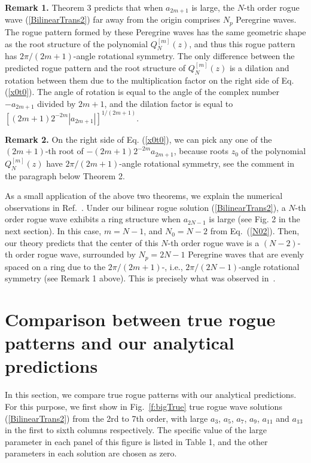 \documentclass[amsmath,amssymb]{revtex4}
\begin{document}
\textbf{Remark 1.} Theorem 3 predicts that when $a_{2m+1}$ is large, the $N$-th order rogue wave (\ref{BilinearTrans2}) far away from the origin comprises $N_p$ Peregrine waves. The rogue pattern formed by these Peregrine waves has the same geometric shape as the root structure of the polynomial $Q_{N}^{[m]}(z)$, and thus this rogue pattern has $2\pi/(2m+1)$-angle rotational symmetry. The only difference between the predicted rogue pattern and the root structure of $Q_{N}^{[m]}(z)$ is a dilation and rotation between them due to the multiplication factor on the right side of Eq. (\ref{x0t0}). The angle of rotation is equal to the angle of the complex number $-a_{2m+1}$ divided by $2m+1$, and the dilation factor is equal to $[(2m+1)2^{-2m}|a_{2m+1}|]^{1/(2m+1)}$.

\textbf{Remark 2.} On the right side of Eq. (\ref{x0t0}), we can pick any one of the $(2m+1)$-th root of
$-(2m+1)2^{-2m}a_{2m+1}$, because roots $z_{0}$ of the polynomial $Q_{N}^{[m]}(z)$ have $2\pi/(2m+1)$-angle rotational symmetry, see the comment in the paragraph below Theorem 2.

As a small application of the above two theorems, we explain the numerical observations in Ref.~\cite{KAAN2011}. Under our bilinear rogue solution (\ref{BilinearTrans2}), a $N$-th order rogue wave exhibits a ring structure when $a_{2N-1}$ is large (see Fig. 2 in the next section). In this case, $m=N-1$, and $N_0=N-2$ from Eq.~(\ref{N02}). Then, our theory predicts that the center of this $N$-th order rogue wave is a $(N-2)$-th order rogue wave, surrounded by $N_p=2N-1$ Peregrine waves that are evenly spaced on a ring due to the $2\pi/(2m+1)$-, i.e., $2\pi/(2N-1)$-angle rotational symmetry (see Remark 1 above). This is precisely what was observed in~\cite{KAAN2011}.

\section{Comparison between true rogue patterns and our analytical predictions}
In this section, we compare true rogue patterns with our analytical predictions. For this purpose, we first show in Fig.~\ref{f:bigTrue} true rogue wave solutions (\ref{BilinearTrans2}) from the 2rd to 7th order, with large $a_3$, $a_5$, $a_7$, $a_9$, $a_{11}$ and $a_{13}$ in the first to sixth columns respectively. The specific value of the large parameter in each panel of this figure is listed in Table 1, and the other parameters in each solution are chosen as zero.
\end{document}
